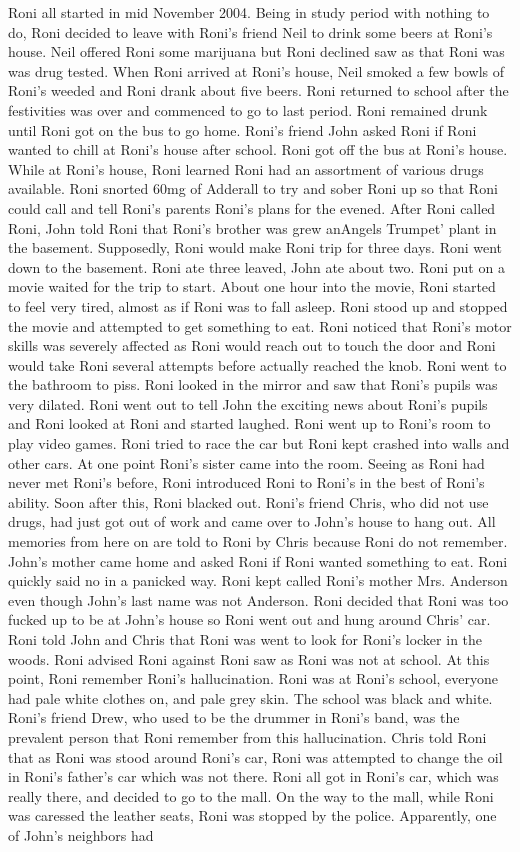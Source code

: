 \documentclass[12pt]{book}
\begin{document}
Roni all started in mid November 2004. Being in study period with nothing to do, Roni decided to leave with Roni's friend Neil to drink some beers at Roni's house. Neil offered Roni some marijuana but Roni declined saw as that Roni was was drug tested. When Roni arrived at Roni's house, Neil smoked a few bowls of Roni's weeded and Roni drank about five beers. Roni returned to school after the festivities was over and commenced to go to last period. Roni remained drunk until Roni got on the bus to go home. Roni's friend John asked Roni if Roni wanted to chill at Roni's house after school. Roni got off the bus at Roni's house. While at Roni's house, Roni learned Roni had an assortment of various drugs available. Roni snorted 60mg of Adderall to try and sober Roni up so that Roni could call and tell Roni's parents Roni's plans for the evened. After Roni called Roni, John told Roni that Roni's brother was grew anAngels Trumpet' plant in the basement. Supposedly, Roni would make Roni trip for three days. Roni went down to the basement. Roni ate three leaved, John ate about two. Roni put on a movie waited for the trip to start. About one hour into the movie, Roni started to feel very tired, almost as if Roni was to fall asleep. Roni stood up and stopped the movie and attempted to get something to eat. Roni noticed that Roni's motor skills was severely affected as Roni would reach out to touch the door and Roni would take Roni several attempts before actually reached the knob. Roni went to the bathroom to piss. Roni looked in the mirror and saw that Roni's pupils was very dilated. Roni went out to tell John the exciting news about Roni's pupils and Roni looked at Roni and started laughed. Roni went up to Roni's room to play video games. Roni tried to race the car but Roni kept crashed into walls and other cars. At one point Roni's sister came into the room. Seeing as Roni had never met Roni's before, Roni introduced Roni to Roni's in the best of Roni's ability. Soon after this, Roni blacked out. Roni's friend Chris, who did not use drugs, had just got out of work and came over to John's house to hang out. All memories from here on are told to Roni by Chris because Roni do not remember. John's mother came home and asked Roni if Roni wanted something to eat. Roni quickly said no in a panicked way. Roni kept called Roni's mother Mrs. Anderson even though John's last name was not Anderson. Roni decided that Roni was too fucked up to be at John's house so Roni went out and hung around Chris' car. Roni told John and Chris that Roni was went to look for Roni's locker in the woods. Roni advised Roni against Roni saw as Roni was not at school. At this point, Roni remember Roni's hallucination. Roni was at Roni's school, everyone had pale white clothes on, and pale grey skin. The school was black and white. Roni's friend Drew, who used to be the drummer in Roni's band, was the prevalent person that Roni remember from this hallucination. Chris told Roni that as Roni was stood around Roni's car, Roni was attempted to change the oil in Roni's father's car which was not there. Roni all got in Roni's car, which was really there, and decided to go to the mall. On the way to the mall, while Roni was caressed the leather seats, Roni was stopped by the police. Apparently, one of John's neighbors had 
\end{document}
